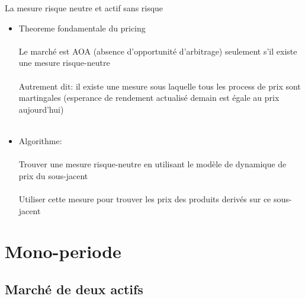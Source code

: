 \documentclass[10pt]{beamer}
\begin{document}
\begin{frame}{La mesure risque neutre et actif sans risque}{}
\begin{block}{}

\scriptsize{  \begin{itemize}
        \item Theoreme fondamentale du pricing\\~\\
        Le marché est AOA (absence d'opportunité d'arbitrage) seulement s'il existe une mesure risque-neutre \\~\\
        Autrement dit: il existe une mesure sous laquelle tous les process de prix sont martingales (esperance de rendement actualisé demain est égale au prix aujourd'hui) \\~\\
        
 \item Algorithme: \\~\\
 Trouver une mesure risque-neutre en utilisant le modèle de dynamique de prix du sous-jacent \\~\\ 
 Utiliser cette mesure pour trouver les prix des produits derivés sur ce sous-jacent
        
        
   \end{itemize}
    
    }
\end{block}
\end{frame}











\section{Mono-periode}



\subsection{Marché de deux actifs}
\end{document}

